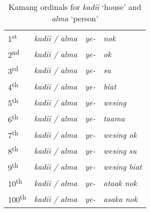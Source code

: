 \begin{table}\centering
\caption{Kamang ordinals for \textit{kadii} `house' and \textit{alma} `person'}





\begin{tabular}{llll}
1\textsuperscript{st} & \textit{kadii / alma} & \textit{ye-} & \textit{nok}\\
2\textsuperscript{nd} & \textit{kadii / alma} & \textit{ye-} & \textit{ok}\\
3\textsuperscript{rd} & \textit{kadii / alma} & \textit{ye-} & \textit{su}\\
4\textsuperscript{th} & \textit{kadii / alma} & \textit{ye-} & \textit{biat}\\
5\textsuperscript{th} & \textit{kadii / alma} & \textit{ye-} & \textit{wesing}\\
6\textsuperscript{th} & \textit{kadii / alma} & \textit{ye-} & \textit{taama}\\
7\textsuperscript{th} & \textit{kadii / alma} & \textit{ye-} & \textit{wesing ok}\\
8\textsuperscript{th} & \textit{kadii / alma} & \textit{ye-} & \textit{wesing su}\\
9\textsuperscript{th} & \textit{kadii / alma} & \textit{ye-} & \textit{wesing biat}\\
10\textsuperscript{th} & \textit{kadii / alma} & \textit{ye-} & \textit{ataak nok}\\
100\textsuperscript{th} & \textit{kadii / alma} & \textit{ye-} & \textit{asaka nok}\\
\end{tabular}

\end{table}

